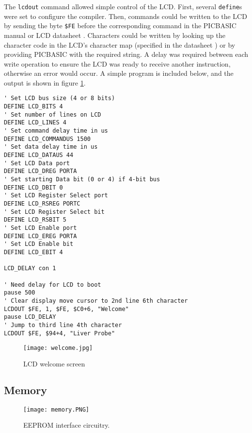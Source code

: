 The \verb|lcdout| command allowed simple control of the LCD. First, several \verb|define|s were set to configure the compiler. Then, commands could be written to the LCD by sending the byte \verb|$FE| before the corresponding command in the PICBASIC manual \cite{picbasic_pro} or LCD datasheet \cite{lcd}. Characters could be written by looking up the character code in the LCD's character map (specified in the datasheet \cite{lcd}) or by providing PICBASIC with the required string. A delay was required between each write operation to ensure the LCD was ready to receive another instruction, otherwise an error would occur. A simple program is included below, and the output is shown in figure \ref{fig: lcd}.

\begin{lstlisting}
' Set LCD bus size (4 or 8 bits)
DEFINE LCD_BITS 4
' Set number of lines on LCD
DEFINE LCD_LINES 4
' Set command delay time in us
DEFINE LCD_COMMANDUS 1500
' Set data delay time in us
DEFINE LCD_DATAUS 44
' Set LCD Data port
DEFINE LCD_DREG PORTA
' Set starting Data bit (0 or 4) if 4-bit bus
DEFINE LCD_DBIT 0
' Set LCD Register Select port
DEFINE LCD_RSREG PORTC
' Set LCD Register Select bit
DEFINE LCD_RSBIT 5
' Set LCD Enable port
DEFINE LCD_EREG PORTA
' Set LCD Enable bit
DEFINE LCD_EBIT 4

LCD_DELAY con 1

' Need delay for LCD to boot
pause 500            
' Clear display move cursor to 2nd line 6th character
LCDOUT $FE, 1, $FE, $C0+6, "Welcome"         
pause LCD_DELAY
' Jump to third line 4th character
LCDOUT $FE, $94+4, "Liver Probe"                
\end{lstlisting}

\begin{figure}[htb]
	\centering
	\texttt{[image: welcome.jpg]}
	\caption{LCD welcome screen}
	\label{fig: lcd}
\end{figure}





\subsection{Memory}
\begin{figure}[htb]
	\centering
	\texttt{[image: memory.PNG]}
	\caption{EEPROM interface circuitry.}
	\label{fig: memory schematic}
\end{figure}

